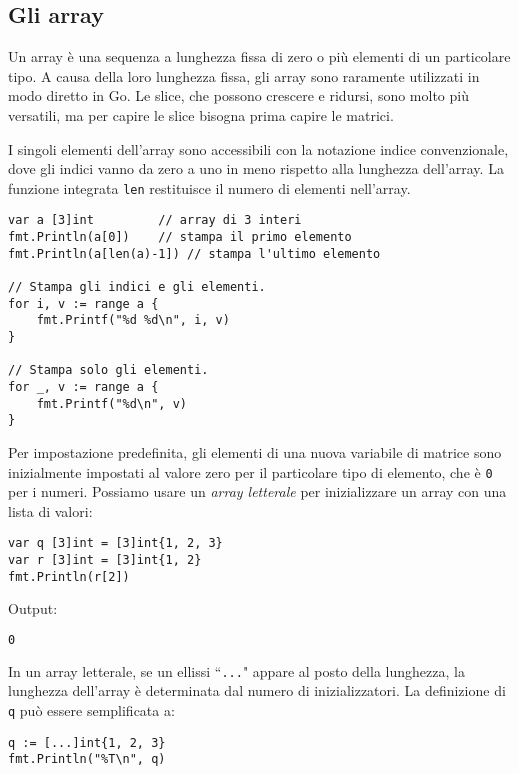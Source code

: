 \documentclass[../../thesis.tex]{subfiles}
\begin{document}
    \subsection{Gli array}\label{subsec:gli-array}
    Un array è una sequenza a lunghezza fissa di zero o più elementi di un particolare tipo.
    A causa della loro lunghezza fissa, gli array sono raramente utilizzati in modo diretto in Go. Le slice, che possono crescere e ridursi, sono molto più versatili, ma per capire le slice bisogna prima capire le matrici.
    \hfill \vspace{12pt}

    I singoli elementi dell'array sono accessibili con la notazione indice convenzionale, dove gli indici vanno da zero a uno in meno rispetto alla lunghezza dell'array.
    La funzione integrata \verb|len| restituisce il numero di elementi nell'array.
    \begin{lstlisting}[frame = single,label={lst:lstlisting3-1.1}]
var a [3]int		 // array di 3 interi
fmt.Println(a[0])	 // stampa il primo elemento
fmt.Println(a[len(a)-1]) // stampa l'ultimo elemento

// Stampa gli indici e gli elementi.
for i, v := range a {
    fmt.Printf("%d %d\n", i, v)
}

// Stampa solo gli elementi.
for _, v := range a {
    fmt.Printf("%d\n", v)
}
    \end{lstlisting}
    Per impostazione predefinita, gli elementi di una nuova variabile di matrice sono inizialmente impostati al valore zero per il particolare tipo di elemento, che è \verb|0| per i numeri.
    Possiamo usare un \textit{array letterale} per inizializzare un array con una lista di valori:
    \begin{lstlisting}[frame = single,label={lst:lstlisting3-1.2}]
var q [3]int = [3]int{1, 2, 3}
var r [3]int = [3]int{1, 2}
fmt.Println(r[2])
    \end{lstlisting}
    Output:
    \begin{lstlisting}[language = bash, frame = L,label={lst:lstlisting3-1.3}]
0
    \end{lstlisting}
    In un array letterale, se un ellissi ``\verb|...|" appare al posto della lunghezza, la lunghezza dell'array è determinata dal numero di inizializzatori.
    La definizione di \verb|q| può essere semplificata a:
    \begin{lstlisting}[frame = single,label={lst:lstlisting3-1.4}]
q := [...]int{1, 2, 3}
fmt.Println("%T\n", q)
    \end{lstlisting}
\end{document}
